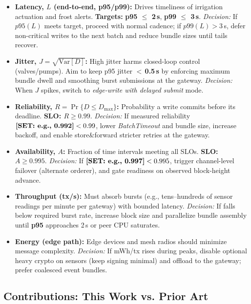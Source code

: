 \documentclass[12pt,onecolumn]{IEEEtran} %
\begin{document}
\begin{itemize}
    \item \textbf{Latency, $L$ (end-to-end, p95/p99):} Drives timeliness of irrigation actuation and frost alerts. \textbf{Targets:} \textbf{p95 $\leq$ 2\,s}, \textbf{p99 $\leq$ 3\,s}. \emph{Decision:} If $p95(L)$ meets target, proceed with normal cadence; if $p99(L)>3$\,s, defer non-critical writes to the next batch and reduce bundle sizes until tails recover.
    \item \textbf{Jitter, $J=\sqrt{\mathrm{Var}[D]}$:} High jitter harms closed-loop control (valves/pumps). Aim to keep p95 jitter $<\,$\textbf{0.5\,s} by enforcing maximum bundle dwell and smoothing burst submissions at the gateway. \emph{Decision:} When $J$ spikes, switch to \emph{edge-write with delayed submit} mode.
    \item \textbf{Reliability, $R=\Pr\{D\leq D_{\max}\}$:} Probability a write commits before its deadline. \textbf{SLO: $R \geq 0.99$}. \emph{Decision:} If measured reliability $\textbf{[SET: e.g., 0.992]}<0.99$, lower \emph{BatchTimeout} and bundle size, increase backoff, and enable store\&forward stricter retries at the gateway.
    \item \textbf{Availability, $A$:} Fraction of time intervals meeting all SLOs. \textbf{SLO: $A \geq 0.995$}. \emph{Decision:} If $\textbf{[SET: e.g., 0.997]}<0.995$, trigger channel-level failover (alternate orderer), and gate readiness on observed block-height advance.
    \item \textbf{Throughput (tx/s):} Must absorb bursts (e.g., tens–hundreds of sensor readings per minute per gateway) with bounded latency. \emph{Decision:} If \CurrentTPS falls below required burst rate, increase block size and parallelize bundle assembly until \textbf{p95} approaches 2\,s or peer CPU saturates.
    \item \textbf{Energy (edge path):} Edge devices and mesh radios should minimize message complexity. \emph{Decision:} If mWh/tx rises during peaks, disable optional heavy crypto on sensors (keep signing minimal) and offload to the gateway; prefer coalesced event bundles.
\end{itemize}

\subsection{Contributions: This Work vs. Prior Art}
\label{sec:contrib-box}
\end{document}
